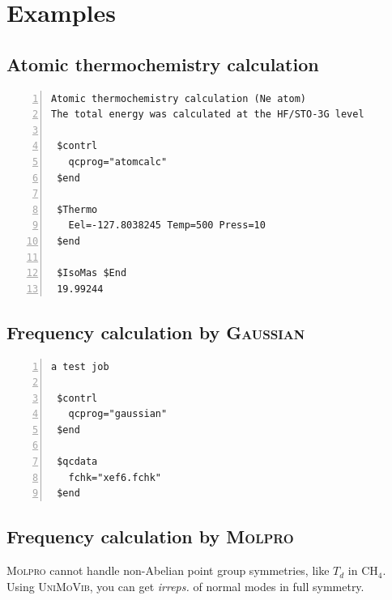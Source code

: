 \documentclass[12pt,english]{extarticle}
\begin{document}
\pagebreak{}


\section{Examples} \label{part:examp}

\subsection{Atomic thermochemistry calculation} \label{sec:exp1}

\begin{Verbatim}[frame=single,label=example,labelposition=topline,numbers=left,rulecolor=\color{blue},fontsize=\footnotesize,baselinestretch=1.0]
Atomic thermochemistry calculation (Ne atom)
The total energy was calculated at the HF/STO-3G level

 $contrl
   qcprog="atomcalc"
 $end

 $Thermo
   Eel=-127.8038245 Temp=500 Press=10
 $end

 $IsoMas $End
 19.99244
\end{Verbatim}

\subsection{Frequency calculation by \textsc{Gaussian}} \label{sec:exp2}

\begin{Verbatim}[frame=single,label=example,labelposition=topline,numbers=left,rulecolor=\color{blue},fontsize=\footnotesize,baselinestretch=1.0]
a test job

 $contrl
   qcprog="gaussian"
 $end

 $qcdata
   fchk="xef6.fchk"
 $end
\end{Verbatim}

\subsection{Frequency calculation by \textsc{Molpro}} \label{sec:exp3}

\textsc{Molpro} cannot handle non-Abelian point group symmetries, like $T_d$ in CH$_4$. Using \textsc{UniMoVib}, you can get \emph{irreps.} of normal modes in full symmetry.
\end{document}
